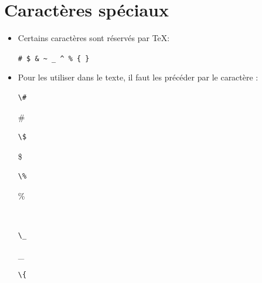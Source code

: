 \section{Caractères spéciaux}

\begin{itemize}
\item Certains caractères sont réservés par {\TeX}:
  \begin{demo}
    \verb=# $ & ~ _ ^ % { }=
  \end{demo}
\item Pour les utiliser dans le texte, il faut les précéder par le caractère {\bs}:
  \begin{demo}
    \begin{minipage}{0.3\linewidth}
      \begin{texample}
\begin{lstlisting}
\#
\end{lstlisting}
        \producing\#
      \end{texample}
    \end{minipage}
    \hfill
    \begin{minipage}{0.3\linewidth}
      \begin{texample}
\begin{lstlisting}
\$
\end{lstlisting}
        \producing\$
      \end{texample}
    \end{minipage}
    \hfill
    \begin{minipage}{0.3\linewidth}
      \begin{texample}
\begin{lstlisting}
\%
\end{lstlisting}
        \producing\%
      \end{texample}
    \end{minipage}
    \\
    \begin{minipage}{0.3\linewidth}
      \begin{texample}
\begin{lstlisting}
\_
\end{lstlisting}
        \producing\_
      \end{texample}
    \end{minipage}
    \hfill
    \begin{minipage}{0.3\linewidth}
      \begin{texample}
\begin{lstlisting}
\{
\end{lstlisting}

\end{texample}
\end{minipage}
\end{demo}
\end{itemize}
